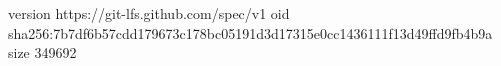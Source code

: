 version https://git-lfs.github.com/spec/v1
oid sha256:7b7df6b57cdd179673c178bc05191d3d17315e0cc1436111f13d49ffd9fb4b9a
size 349692
